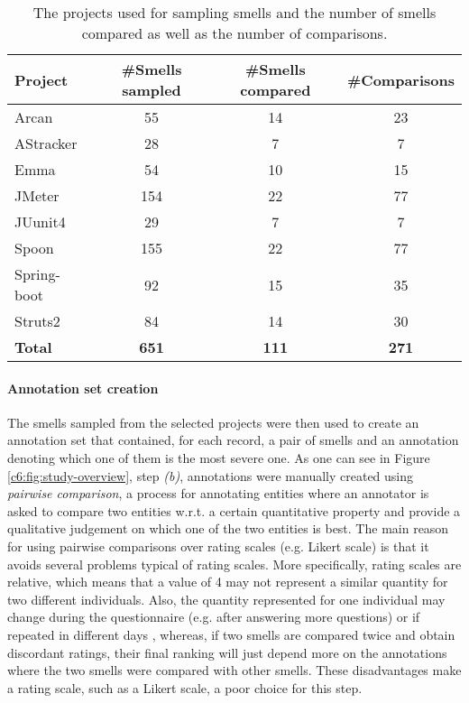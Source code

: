 \begin{table}[]
   \footnotesize
    \centering
    \caption{The projects used for sampling smells and the number of smells compared as well as the number of comparisons.}
    \label{c6:tab:smells-data-set}
    \begin{tabular}{@{}lccc@{}}
    \toprule
    \textbf{Project} & \textbf{\#Smells sampled} & \textbf{\#Smells compared} & \textbf{\#Comparisons} \\ \midrule
    Arcan & 55 & 14 & 23 \\
    AStracker & 28 & 7 & 7 \\
    Emma & 54 & 10 & 15 \\
    JMeter & 154 & 22 & 77 \\
    JUunit4 & 29 & 7 & 7 \\
    Spoon & 155 & 22 & 77 \\
    Spring-boot & 92 & 15 & 35 \\
    Struts2 & 84 & 14 & 30 \\ \midrule
    \textbf{Total} & \textbf{651} & \textbf{111} & \textbf{271} \\ \bottomrule
    \end{tabular}
\end{table}

\paragraph{Annotation set creation}
The smells sampled from the selected projects were then used to create an annotation set that contained, for each record, a pair of smells and an annotation denoting which one of them is the most severe one.
As one can see in Figure \ref{c6:fig:study-overview}, step \emph{(b)}, annotations were manually created using \emph{pairwise comparison}, a process for annotating entities \cite{David1963} where an annotator is asked to compare two entities w.r.t. a certain quantitative property and provide a qualitative judgement on which one of the two entities is best.
The main reason for using pairwise comparisons over rating scales (e.g. Likert scale) is that it avoids several problems typical of rating scales. 
More specifically, rating scales are relative, which means that a value of 4 may not represent a similar quantity for two different individuals.
Also, the quantity represented for one individual may change during the questionnaire (e.g. after answering more questions) or if repeated in different days \cite{Perezortiz2017}, whereas, if two smells are compared twice and obtain discordant ratings, their final ranking will just depend more on the annotations where the two smells were compared with other smells.
These disadvantages make a rating scale, such as a Likert scale, a poor choice for this step.

